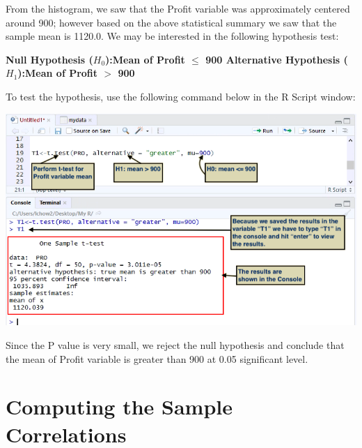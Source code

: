 \documentclass[a4paper]{report}
\begin{document}
        \begin{flushleft}
        From the histogram, we saw that the Profit variable was approximately centered around 900; however based on the above statistical summary we saw that the sample mean is 1120.0. We may be interested in the following hypothesis test:

        \textbf{Null Hypothesis ($H_{0}$):\hspace{0.5in}Mean of Profit $\leq$ 900 \newline
        Alternative Hypothesis ($H_{1}$):Mean of Profit $>$ 900}
        
        \newpage
        To test the hypothesis, use the following command below in the R Script window: \newline \newline

        \includegraphics[width=\textwidth]{images/TTEST1.png}

        Since the P value is very small, we reject the null hypothesis and conclude that the mean of Profit variable is greater than 900 at 0.05 significant level.
        \end{flushleft}
        
    \section{Computing the Sample Correlations}
    
\end{document}
